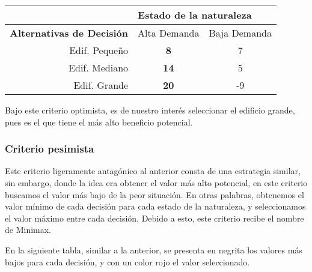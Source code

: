 \begin{table}[H]
    \begin{tabular}{r|cc|}
        \cline{2-3}
        \multicolumn{1}{l|}{}                                   & \multicolumn{2}{l|}{\textbf{Estado de la naturaleza}}                                       \\ \hline
        \multicolumn{1}{|l|}{\textbf{Alternativas de Decisión}} & \multicolumn{1}{l|}{Alta Demanda}                       & \multicolumn{1}{l|}{Baja Demanda} \\ \hline
        \multicolumn{1}{|r|}{Edif. Pequeño}                     & \multicolumn{1}{c|}{\textbf{8}}                         & 7                                 \\
        \multicolumn{1}{|r|}{Edif. Mediano}                     & \multicolumn{1}{c|}{\textbf{14}}                        & 5                                 \\
        \multicolumn{1}{|r|}{Edif. Grande}                      & \multicolumn{1}{c|}{{\color[HTML]{CB0000} \textbf{20}}} & -9                                \\ \hline
    \end{tabular}
\end{table}

Bajo este criterio optimista, es de nuestro interés seleccionar el edificio grande, pues es el que tiene el más alto beneficio potencial.

\subsubsection{Criterio pesimista}
Este criterio ligeramente antagónico al anterior consta de una estrategia similar, sin embargo, donde la idea era obtener el valor más alto potencial, en este criterio buscamos el valor más bajo de la peor situación. En otras palabras, obtenemos el valor mínimo de cada decisión para cada estado de la naturaleza, y seleccionamos el valor máximo entre cada decisión. Debido a esto, este criterio recibe el nombre de Minimax.

En la siguiente tabla, similar a la anterior, se presenta en negrita los valores más bajos para cada decisión, y con un color rojo el valor seleccionado.

